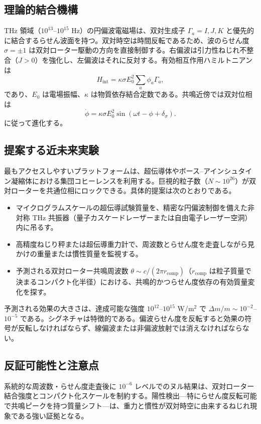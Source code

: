 \documentclass[a4paper]{article}
\begin{document}
\subsection{理論的結合機構}

THz 領域（$10^{13}$--$10^{15}$ Hz）の円偏波電磁場は、双対生成子 $\Gamma_a = I, J, K$ と優先的に結合するらせん波面を持つ。双対時空は時間反転であるため、波のらせん度 $\sigma = \pm 1$ は双対ローター駆動の方向を直接制御する。右偏波は引力性ねじれ不整合（$J > 0$）を強化し、左偏波はそれに反対する。有効相互作用ハミルトニアンは
\[
H_\text{int} = \kappa \sigma E_0^2 \sum_a \phi_a \Gamma_a,
\]
であり、$E_0$ は電場振幅、$\kappa$ は物質依存結合定数である。共鳴近傍では双対位相は
\[
\dot{\phi} = \kappa \sigma E_0^2 \sin(\omega t - \phi + \delta_\sigma).
\]
に従って進化する。

\subsection{提案する近未来実験}

最もアクセスしやすいプラットフォームは、超伝導体やボース--アインシュタイン凝縮体における集団コヒーレンスを利用する。巨視的粒子数（$N \sim 10^{26}$）が双対ローターを共通位相にロックできる。具体的提案は次のとおりである。

\begin{itemize}
\item マイクログラムスケールの超伝導試験質量を、精密な円偏波制御を備えた非対称 THz 共振器（量子カスケードレーザーまたは自由電子レーザー空洞）内に吊るす。
\item 高精度ねじり秤または超伝導重力計で、周波数とらせん度を走査しながら見かけの重量または慣性質量を監視する。
\item 予測される双対ローター共鳴周波数 $\theta \sim c / (2\pi r_\text{comp})$（$r_\text{comp}$ は粒子質量で決まるコンパクト化半径）における、共鳴的かつらせん度依存の有効質量変化を探す。
\end{itemize}

予測される効果の大きさは、達成可能な強度 $10^{12}$--$10^{15}$ W/m$^2$ で $\Delta m / m \sim 10^{-2}$--$10^{-5}$ である。シグネチャは特徴的である。偏波らせん度を反転すると効果の符号が反転しなければならず、線偏波または非偏波放射では消えなければならない。

\subsection{反証可能性と注意点}

系統的な周波数・らせん度走査後に $10^{-6}$ レベルでのヌル結果は、双対ローター結合強度とコンパクト化スケールを制約する。陽性検出---特にらせん度反転可能で共鳴ピークを持つ質量シフト---は、重力と慣性が双対時空に由来するねじれ現象である強い証拠となる。
\end{document}
